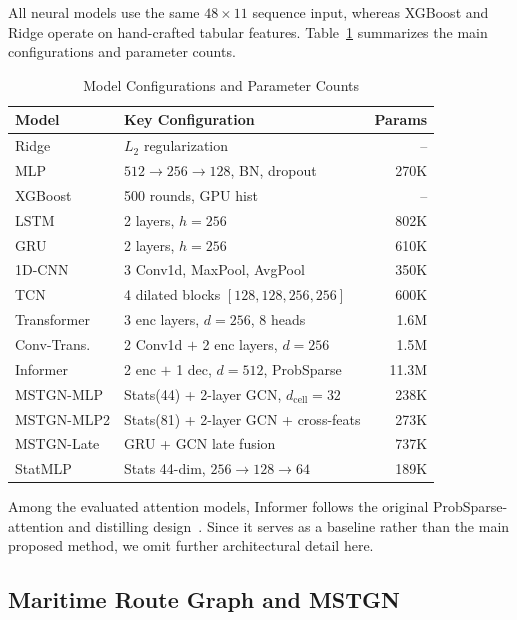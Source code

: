 \documentclass[sigconf,anonymous]{acmart}%
\begin{document}
All neural models use the same $48 \times 11$ sequence input, whereas XGBoost and Ridge operate on hand-crafted tabular features. Table~\ref{tab:model_configs} summarizes the main configurations and parameter counts.

\begin{table}[t]
    \centering
    \caption{Model Configurations and Parameter Counts}
    \label{tab:model_configs}
    \begin{tabular}{llr}
        \toprule
        \textbf{Model} & \textbf{Key Configuration} & \textbf{Params} \\
        \midrule
        Ridge & $L_2$ regularization & -- \\
        MLP & $512{\to}256{\to}128$, BN, dropout & 270K \\
        XGBoost & 500 rounds, GPU hist & -- \\
        \midrule
        LSTM & 2 layers, $h{=}256$ & 802K \\
        GRU & 2 layers, $h{=}256$ & 610K \\
        \midrule
        1D-CNN & 3 Conv1d, MaxPool, AvgPool & 350K \\
        TCN & 4 dilated blocks $[128,128,256,256]$ & 600K \\
        \midrule
        Transformer & 3 enc layers, $d{=}256$, 8 heads & 1.6M \\
        Conv-Trans. & 2 Conv1d $+$ 2 enc layers, $d{=}256$ & 1.5M \\
        Informer & 2 enc $+$ 1 dec, $d{=}512$, ProbSparse & 11.3M \\
        \midrule
        MSTGN-MLP & Stats(44) + 2-layer GCN, $d_\text{cell}{=}32$ & 238K \\
        MSTGN-MLP2 & Stats(81) + 2-layer GCN + cross-feats & 273K \\
        MSTGN-Late & GRU + GCN late fusion & 737K \\
        StatMLP & Stats 44-dim, $256{\to}128{\to}64$ & 189K \\
        \bottomrule
    \end{tabular}
\end{table}

Among the evaluated attention models, Informer follows the original ProbSparse-attention and distilling design~\cite{zhou2021informer}. Since it serves as a baseline rather than the main proposed method, we omit further architectural detail here.


\subsection{Maritime Route Graph and MSTGN}
\label{sec:mstgn}
\end{document}
